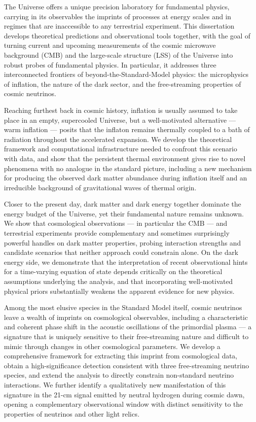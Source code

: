 
The Universe offers a unique precision laboratory for fundamental physics, carrying in its observables the imprints of processes at energy scales and in regimes that are inaccessible to any terrestrial experiment. This dissertation develops theoretical predictions and observational tools together, with the goal of turning current and upcoming measurements of the cosmic microwave background (CMB) and the large-scale structure (LSS) of the Universe into robust probes of fundamental physics. In particular, it addresses three interconnected frontiers of beyond-the-Standard-Model physics: the microphysics of inflation, the nature of the dark sector, and the free-streaming properties of cosmic neutrinos.

Reaching furthest back in cosmic history, inflation is usually assumed to take place in an empty, supercooled Universe, but a well-motivated alternative — warm inflation — posits that the inflaton remains thermally coupled to a bath of radiation throughout the accelerated expansion. We develop the theoretical framework and computational infrastructure needed to confront this scenario with data, and show that the persistent thermal environment gives rise to novel phenomena with no analogue in the standard picture, including a new mechanism for producing the observed dark matter abundance during inflation itself and an irreducible background of gravitational waves of thermal origin.

Closer to the present day, dark matter and dark energy together dominate the energy budget of the Universe, yet their fundamental nature remains unknown. We show that cosmological observations — in particular the CMB — and terrestrial experiments provide complementary and sometimes surprisingly powerful handles on dark matter properties, probing interaction strengths and candidate scenarios that neither approach could constrain alone. On the dark energy side, we demonstrate that the interpretation of recent observational hints for a time-varying equation of state depends critically on the theoretical assumptions underlying the analysis, and that incorporating well-motivated physical priors substantially weakens the apparent evidence for new physics.

Among the most elusive species in the Standard Model itself, cosmic neutrinos leave a wealth of imprints on cosmological observables, including a characteristic and coherent phase shift in the acoustic oscillations of the primordial plasma — a signature that is uniquely sensitive to their free-streaming nature and difficult to mimic through changes in other cosmological parameters. We develop a comprehensive framework for extracting this imprint from cosmological data, obtain a high-significance detection consistent with three free-streaming neutrino species, and extend the analysis to directly constrain non-standard neutrino interactions. We further identify a qualitatively new manifestation of this signature in the 21-cm signal emitted by neutral hydrogen during cosmic dawn, opening a complementary observational window with distinct sensitivity to the properties of neutrinos and other light relics.
